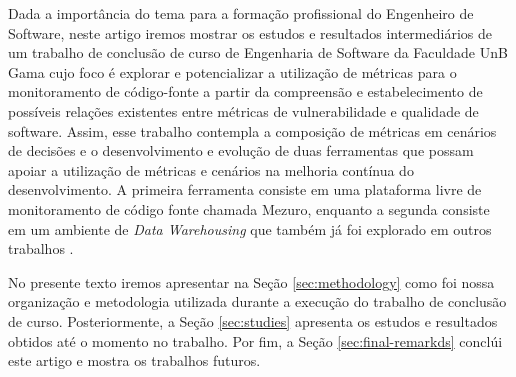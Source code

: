 Dada a importância do tema para a formação profissional do Engenheiro de Software, neste artigo iremos mostrar os estudos e resultados intermediários de um trabalho de conclusão de curso de Engenharia de Software da Faculdade UnB Gama cujo foco é explorar e potencializar a utilização de métricas para o monitoramento de código-fonte a partir da compreensão e estabelecimento de possíveis relações existentes entre métricas de vulnerabilidade e qualidade de software. Assim, esse trabalho contempla a composição de métricas em cenários de decisões e o desenvolvimento e evolução de duas ferramentas que possam apoiar a utilização de métricas e cenários na melhoria contínua do desenvolvimento. A primeira ferramenta consiste em uma plataforma livre de monitoramento de código fonte chamada Mezuro, enquanto a segunda consiste em um ambiente de \emph{Data Warehousing} que também já foi explorado em outros trabalhos \cite{Folleco2007}\cite{Silveira2010}\cite{mazuco2011}.

No presente texto iremos apresentar na Seção \ref{sec:methodology} como foi nossa organização e metodologia utilizada durante a execução do trabalho de conclusão de curso. Posteriormente, a Seção \ref{sec:studies} apresenta os estudos e resultados obtidos até o momento no trabalho. Por fim, a Seção \ref{sec:final-remarkds} conclúi este artigo e mostra os trabalhos futuros.
